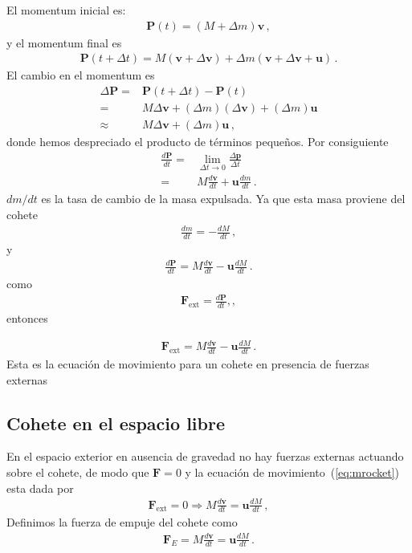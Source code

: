 El momentum inicial es:
\begin{align}
  \mathbf{P}(t)=(M+\Delta m)\mathbf{v}\,,
\end{align}
y el momentum final es
\begin{align}
  \mathbf{P}(t+\Delta t)=M(\mathbf{v}+\Delta\mathbf{v})+\Delta m(\mathbf{v}+\Delta\mathbf{v}+\mathbf{u})\,.
\end{align}
El cambio en el momentum es
\begin{align}
  \Delta\mathbf{P}=&\mathbf{P}(t+\Delta t)-\mathbf{P}(t)\nonumber\\
=&M\Delta\mathbf{v}+(\Delta m)(\Delta\mathbf{v})+(\Delta m)\mathbf{u}\nonumber\\
\approx &M\Delta\mathbf{v}+(\Delta m)\mathbf{u}\,,
\end{align}
donde hemos despreciado el producto de términos pequeños. Por consiguiente
\begin{align}
  \frac{d\mathbf{P}}{dt}=&\lim_{\Delta t\to 0}\frac{\Delta\mathbf{p}}{\Delta t}\nonumber\\
=&M\frac{d\mathbf{v}}{dt}+\mathbf{u}\frac{dm}{dt}\,.
\end{align}
$dm/dt$ es la tasa de cambio de la masa expulsada. Ya que esta masa proviene del cohete
\begin{align}
  \frac{dm}{dt}=-\frac{dM}{dt}\,,
\end{align}
y
\begin{align}
  \frac{d\mathbf{P}}{dt}=M\frac{d\mathbf{v}}{dt}-\mathbf{u}\frac{dM}{dt}\,.
\end{align}
como
\begin{align}
  \mathbf{F}_{\text{ext}}=\frac{d\mathbf{P}}{dt},,
\end{align}
entonces
\begin{frame}
\begin{align}
  \label{eq:mrocket}
   \mathbf{F}_{\text{ext}}=M\frac{d\mathbf{v}}{dt}-\mathbf{u}\frac{dM}{dt}\,.
\end{align}
Esta es la ecuación de movimiento para un cohete en presencia de
fuerzas externas  
\end{frame}


\subsection{Cohete en el espacio libre}

En el espacio exterior en ausencia de gravedad no hay fuerzas externas actuando sobre el cohete, de modo que $\mathbf{F}=0$ y la ecuación de movimiento~(\ref{eq:mrocket}) esta dada por
\begin{align}
\label{eq:m40}
  \mathbf{F}_{\text{ext}}=0\Longrightarrow M\frac{d\mathbf{v}}{dt}=\mathbf{u}\frac{dM}{dt}\,,
\end{align}
Definimos la fuerza de empuje del cohete como
\begin{align}
  \label{eq:m39}
  \mathbf{F}_E=M\frac{d\mathbf{v}}{dt}=\mathbf{u}\frac{dM}{dt}\,.
\end{align}

